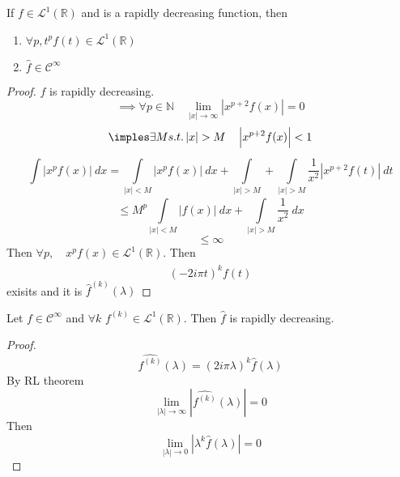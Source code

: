 \begin{ftheo}[Property 1]    
If $ f \in \mathscr{L}^1\left( \mathbb{R}\right)  $ and is a rapidly decreasing function,
then 
\begin{enumerate}
    \item $ \forall p, t^pf(t) \in \mathscr{L}^1\left( \mathbb{R}\right)   $
    \item $ \widehat{f} \in \mathscr{ C } ^{\infty}  $
\end{enumerate}
    \label{th:}
\end{ftheo}
\begin{proof}
    $ f $ is rapidly decreasing. 
    \[
        \implies \forall p \in \mathbb{N} \quad \lim_{ \left | x \right | \to \infty}
        \left | x^{p+2} f(x)  \right | = 0
    \]
    \[
        \imples \exists M s.t. \left | x \right | > M  \quad \left | x^{p+2} f(x)  \right
        | < 1   
    \]
    \[
    \int\limits_{ }^{ } \left | x^p f(x)  \right | \ dx = \int\limits_{ \left | x \right |
    < M }^{ } \left | x^p f(x)  \right | \ dx + \int\limits_{ \left | x \right | > M
}^{}  + \int\limits_{ \left | x \right | > M }^{ } \frac{ 1 }{ x^2  } \left | x^{p+2} f(t)
\right | \ dt 
    \]
    \[
        \leq M^p \int\limits_{ \left | x \right | < M }^{ } \left | f(x)  \right | \ dx +
        \int\limits_{ \left | x  \right | > M }^{ } \frac{ 1  }{ x^2  } \ dx
    \]
    \[
    \leq \infty 
    \]
    Then $ \forall p, \quad x^p f(x) \in \mathscr{L}^1\left( \mathbb{R}\right)   $. 
    Then
    \[
        \widehat{ \left( -2i\pi t \right) ^k f(t) } 
    \] exisits and it is $ \widehat{f}^{(k)} \left( \lambda \right)  $

\end{proof}

\begin{ftheo}[Property 2]
    Let $ f \in \mathscr{ C } ^{\infty}  $ and $ \forall k  $ $ f^{(k)} \in
    \mathscr{L}^1\left( \mathbb{R}\right)   $. Then $ \widehat{f}  $ is rapidly
    decreasing.     
    \label{th:Property 2}
\end{ftheo}
\begin{proof}
    \[
        \widehat{f _{  }^{ (k) } }\left( \lambda \right) = \left( 2i\pi\lambda \right) ^k
        \widehat{f} \left( \lambda \right)          
    \]
    By RL theorem 
    \[
        \lim_{ \left | \lambda  \right | \to \infty} \left | \widehat{f _{  }^{ (k)  } }
         (\lambda)  \right| = 0  
    \]
    Then 
    \[
        \lim_{ \left | \lambda  \right | \to 0} \left | \lambda^k \widehat{f}(\lambda)
        \right | = 0
    \]
\end{proof}
